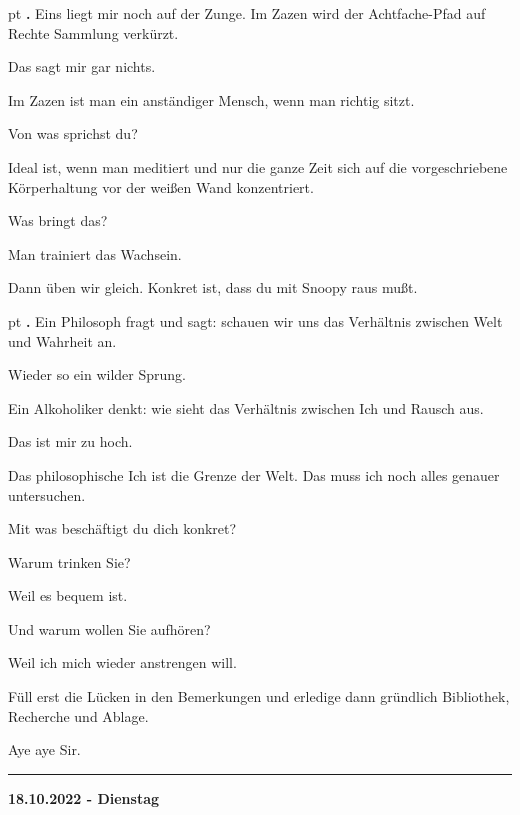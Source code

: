 \documentclass[10pt,a4paper]{article}
\newcounter{notec}
\newcommand\notep[1]{%
  \stepcounter{notec}
  \vskip #1pt
  {\bf\arabic{notec}.}
}
\newcommand\rele[1] {{\color {english} \bf {#1}}}              %
\newcommand\ddivide {\vskip -9pt \hrule \vskip 6pt}
\begin{document}
\begin{mdframed}[style=daystyle]
  \notep 4 Eins liegt mir noch auf der Zunge. Im Zazen wird der Achtfache-Pfad auf
  Rechte Sammlung verkürzt.

  \vskip 2pt
  Das sagt mir gar nichts.

  \vskip 2pt
  Im Zazen ist man ein anständiger Mensch, wenn man richtig sitzt.

  \vskip 2pt
  Von was sprichst du?

  \vskip 2pt
  Ideal ist, wenn man meditiert und nur die ganze Zeit sich auf die
  vorgeschriebene Körperhaltung vor der weißen Wand konzentriert.

  \vskip 2pt
  Was bringt das?

  \vskip 2pt
  Man trainiert das Wachsein.

  \vskip 2pt
  Dann üben wir gleich. Konkret ist, dass du mit Snoopy raus mußt.


  \notep 4 Ein Philosoph fragt und sagt: schauen wir uns das Verhältnis zwischen Welt und Wahrheit an.

  \vskip 2pt
  Wieder so ein wilder Sprung.

  \vskip 2pt
  Ein Alkoholiker denkt: wie sieht das Verhältnis zwischen Ich und Rausch aus.

  \vskip 2pt
  Das ist mir zu hoch.

  \vskip 2pt
  Das philosophische Ich ist die Grenze der Welt. Das muss ich noch alles genauer untersuchen.

  \vskip 2pt
  Mit was beschäftigt du dich konkret?

  \vskip 2pt
  Warum trinken Sie?

  \vskip 2pt
  Weil es bequem ist.

  \vskip 2pt
  Und warum wollen Sie aufhören?

  \vskip 2pt
  Weil ich mich wieder anstrengen will.

  \vskip 2pt
  Füll erst die Lücken in den Bemerkungen und erledige dann gründlich
  Bibliothek, Recherche und Ablage.

  \vskip 2pt
  Aye aye Sir.

\end{mdframed}


\ddivide
{\rele {18.10.2022 - Dienstag}}
       
\end{document}
